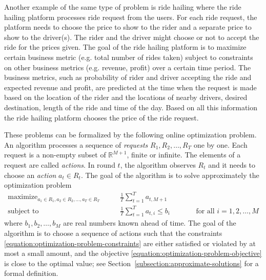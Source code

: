 \documentclass[12pt]{article}
\newcommand{\R}{\mathbb{R}}
\DeclareMathOperator*{\maximize}{maximize}
\DeclareMathOperator*{\subjectto}{subject\ to}
\theoremstyle{definition}
\begin{document}
Another example of the same type of problem is ride hailing where the ride
hailing platform processes ride request from the users. For each ride request,
the platform needs to choose the price to show to the rider and a separate price
to show to the driver(s). The rider and the driver might choose or not to accept
the ride for the prices given. The goal of the ride hailing platform is to
maximize certain business metric (e.g. total number of rides taken) subject to
constraints on other business metrics (e.g. revenue, profit) over a certain time
period. The business metrics, such as probability of rider and driver accepting
the ride and expected revenue and profit, are predicted at the time when the
request is made based on the location of the rider and the locations of nearby
drivers, desired destination, length of the ride and time of the day. Based on
all this information the ride hailing platform chooses the price of the ride
request.

These problems can be formalized by the following online optimization problem.
An algorithm processes a sequence of \emph{requests} $R_1, R_2, \dots, R_T$ one
by one. Each request is a non-empty subset of $\R^{M+1}$, finite or infinite.
The elements of a request are called \emph{actions}. In round $t$, the algorithm
observes $R_t$ and it needs to choose an \emph{action} $a_t \in R_t$. The goal
of the algorithm is to solve approximately the optimization problem
\begin{subequations}
\label{equation:optimization-problem}
\begin{align}
\maximize_{a_1 \in R_1, a_2 \in R_2, \dots, a_T \in R_T} \qquad & \frac{1}{T} \sum_{t=1}^T a_{t,M+1} \label{equation:optimization-problem-objective} \\
\subjectto \qquad & \frac{1}{T} \sum_{t=1}^T a_{t,i} \le b_i && \qquad \text{for all $i=1,2,\dots,M$} \label{equation:optimization-problem-constraints}
\end{align}
\end{subequations}
where $b_1, b_2, \dots, b_M$ are real numbers known ahead of time. The goal of
the algorithm is to choose a sequence of actions such that the constraints
\eqref{equation:optimization-problem-constraints} are either satisfied or
violated by at most a small amount, and the objective
\eqref{equation:optimization-problem-objective} is close to the optimal value;
see Section~\ref{subsection:approximate-solutions} for a formal definition.
\end{document}
